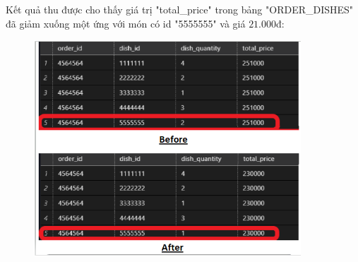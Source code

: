 \documentclass[13pt,a4paper]{article}
\begin{document}
	Kết quả thu được cho thấy giá trị "total\_price" trong bảng "ORDER\_DISHES" đã giảm xuống một ứng với món có id "5555555" và giá $21.000$đ:
	\begin{figure}[h!]
		\begin{center}
			\includegraphics[width=10cm]{vitran/trigger_dl.png}
		\end{center}
	\end{figure}
	\newpage
\end{document}
